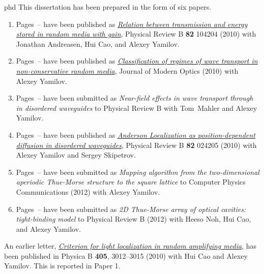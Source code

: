 \documentclass[times,12pt,titlepage]{mstthesis} %
\begin{document}


\begin{ThesisPublicationOption}{phd}
This dissertation has been prepared in the form of six papers.

\renewcommand{\theenumi}{Paper \arabic{enumi}}
\begin{enumerate}%
\item Pages~\pageref{paper:1_start}--\pageref{paper:1_end} have been published as 
  \textit{\href{http://link.aps.org/doi/10.1103/PhysRevB.82.104204}{Relation between transmission and energy stored in random media with gain}}, Physical Review B \textbf{82} 104204 (2010) with Jonathan Andreasen, Hui Cao, and Alexey Yamilov.
\item Pages~\pageref{paper:2_start}--\pageref{paper:2_end} have been published as 
  \textit{\href{http://dx.doi.org/10.1080/09500340.2010.519443}{Classification of regimes of wave transport in non-conservative random media}}, Journal of Modern Optics (2010) with Alexey Yamilov.
\item Pages~\pageref{paper:3_start}--\pageref{paper:3_end} have been submitted as
  \textit{Near-field effects in wave transport through in disordered waveguides} to Physical Review B with Tom~Mahler and Alexey Yamilov.
\item Pages~\pageref{paper:4_start}--\pageref{paper:4_end} have been published as 
  \textit{\href{http://link.aps.org/doi/10.1103/PhysRevB.82.024205}{Anderson Localization as position-dependent diffusion in disordered waveguides}}, 
  Physical Review B \textbf{82} 024205 (2010) with Alexey Yamilov and Sergey Skipetrov.  
\item Pages~\pageref{paper:5_start}--\pageref{paper:5_end} have been submitted as 
  \textit{Mapping algorithm from the two-dimensional aperiodic Thue-Morse structure to the square lattice} to Computer Physics Communications (2012) with Alexey Yamilov.
\item Pages~\pageref{paper:6_start}--\pageref{paper:6_end} have been submitted as 
  \textit{2D Thue-Morse array of optical cavities: tight-binding model} to Physical Review B (2012) with Heeso Noh, Hui Cao, and Alexey Yamilov.
\end{enumerate}
\renewcommand{\theenumi}{\arabic{enumi}}

An earlier letter, 
\textit{\href{http://dx.doi.org/10.1016/j.physb.2010.01.025}{Criterion for light localization in random amplifying media}}, 
has been published in Physica B \textbf{405}, 3012--3015 (2010) with Hui Cao and Alexey Yamilov. This is reported in Paper 1.

\end{ThesisPublicationOption}
\begin{ThesisAbstract}

\end{ThesisAbstract}
\end{document}
